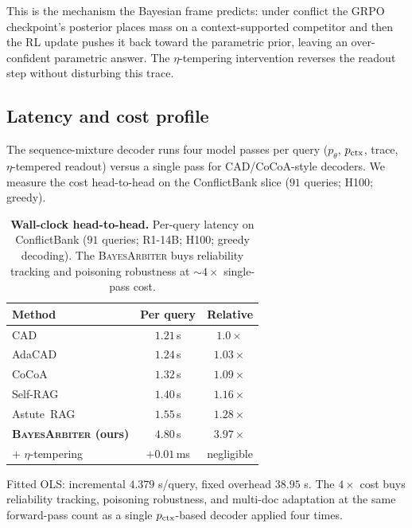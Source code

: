 This is the mechanism the Bayesian frame predicts: under conflict the
GRPO checkpoint's posterior places mass on a context-supported
competitor and then the RL update pushes it back toward the parametric
prior, leaving an over-confident parametric answer.  The
$\eta$-tempering intervention reverses the readout step without
disturbing this trace.

\subsection{Latency and cost profile}
\label{app:latency-profile}

The sequence-mixture decoder runs four model passes per query
($p_\theta$, $p_{\mathrm{ctx}}$, trace, $\eta$-tempered readout) versus a single
pass for CAD/CoCoA-style decoders.  We measure the cost head-to-head
on the ConflictBank slice ($91$ queries; H100; greedy).

\begin{table}[H]
\centering\small
\caption{\textbf{Wall-clock head-to-head.}  Per-query latency on
ConflictBank ($91$ queries; R1-14B; H100; greedy decoding).  The
\textsc{BayesArbiter} buys reliability tracking and poisoning robustness at
$\sim\!4\times$ single-pass cost.}
\label{tab:latency-profile}
\setlength{\tabcolsep}{6pt}
\begin{tabular}{lcc}
\toprule
\textbf{Method} & \textbf{Per query} & \textbf{Relative}\\
\midrule
CAD                 & $1.21$\,s & $1.0\times$\\
AdaCAD              & $1.24$\,s & $1.03\times$\\
CoCoA               & $1.32$\,s & $1.09\times$\\
Self-RAG            & $1.40$\,s & $1.16\times$\\
Astute~RAG          & $1.55$\,s & $1.28\times$\\
\midrule
\textbf{\textsc{BayesArbiter} (ours)} & $4.80$\,s & $\mathbf{3.97\times}$\\
+ $\eta$-tempering      & $+0.01$\,ms & negligible\\
\bottomrule
\end{tabular}
\end{table}

Fitted OLS: incremental $4.379$ s/query, fixed overhead $38.95$ s.
The $4\times$ cost buys reliability tracking, poisoning robustness,
and multi-doc adaptation at the same forward-pass count as a single
$p_{\mathrm{ctx}}$-based decoder applied four times.

